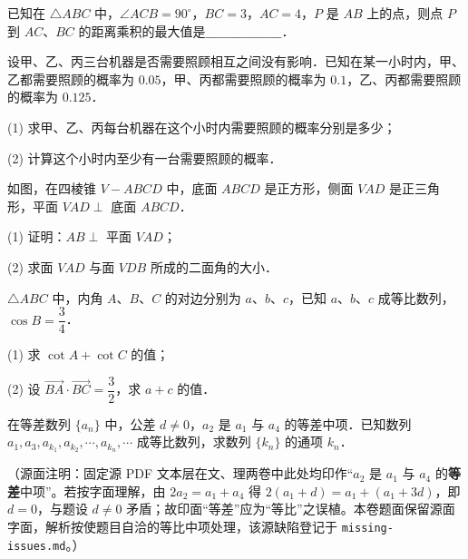 \begin{question}
已知在 $\triangle ABC$ 中，$\angle ACB = 90^\circ$，$BC = 3$，$AC = 4$，$P$ 是 $AB$ 上的点，则点 $P$ 到 $AC$、$BC$ 的距离乘积的最大值是＿＿＿＿＿＿．

\end{question}
\begin{question}
设甲、乙、丙三台机器是否需要照顾相互之间没有影响．已知在某一小时内，甲、乙都需要照顾的概率为 $0.05$，甲、丙都需要照顾的概率为 $0.1$，乙、丙都需要照顾的概率为 $0.125$．

(1) 求甲、乙、丙每台机器在这个小时内需要照顾的概率分别是多少；

(2) 计算这个小时内至少有一台需要照顾的概率．

\Needspace{0.4\textheight}
\end{question}
\begin{question}
如图，在四棱锥 $V - ABCD$ 中，底面 $ABCD$ 是正方形，侧面 $VAD$ 是正三角形，平面 $VAD \perp$ 底面 $ABCD$．

(1) 证明：$AB \perp$ 平面 $VAD$；

(2) 求面 $VAD$ 与面 $VDB$ 所成的二面角的大小．
\nopagebreak[4]
\begin{center}\end{center}
\nopagebreak[4]
\end{question}
\begin{question}
$\triangle ABC$ 中，内角 $A$、$B$、$C$ 的对边分别为 $a$、$b$、$c$，已知 $a$、$b$、$c$ 成等比数列，$\cos B = \dfrac{3}{4}$．

(1) 求 $\cot A + \cot C$ 的值；

(2) 设 $\overrightarrow{BA} \cdot \overrightarrow{BC} = \dfrac{3}{2}$，求 $a + c$ 的值．

\end{question}
\begin{question}
在等差数列 $\{a_n\}$ 中，公差 $d \neq 0$，$a_2$ 是 $a_1$ 与 $a_4$ 的等差中项．已知数列 $a_1, a_3, a_{k_1}, a_{k_2}, \cdots, a_{k_n}, \cdots$ 成等比数列，求数列 $\{k_n\}$ 的通项 $k_n$．

\begin{gktip}
（源面注明：固定源 PDF 文本层在文、理两卷中此处均印作“$a_2$ 是 $a_1$ 与 $a_4$ 的\textbf{等差}中项”。若按字面理解，由 $2a_2 = a_1 + a_4$ 得 $2(a_1+d) = a_1 + (a_1+3d)$，即 $d = 0$，与题设 $d\neq 0$ 矛盾；故印面“等差”应为“等比”之误植。本卷题面保留源面字面，解析按使题目自洽的等比中项处理，该源缺陷登记于 \texttt{missing-issues.md}。）
\end{gktip}

\end{question}
